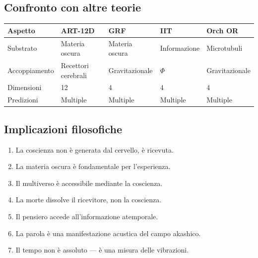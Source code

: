 \subsection{Confronto con altre teorie}
\begin{table}[H]
\centering
\begin{tabular}{@{}lllll@{}}
\toprule
\textbf{Aspetto} & \textbf{ART-12D} & \textbf{GRF} & \textbf{IIT} & \textbf{Orch OR} \\ \midrule
Substrato & Materia oscura & Materia oscura & Informazione & Microtubuli \\
Accoppiamento & Recettori cerebrali & Gravitazionale & $\Phi$ & Gravitazionale \\
Dimensioni & 12 & 4 & 4 & 4 \\
Predizioni & Multiple & Multiple & Multiple & Multiple \\ \bottomrule
\end{tabular}
\end{table}

\subsection{Implicazioni filosofiche}
\begin{enumerate}
    \item La coscienza non è generata dal cervello, è ricevuta.
    \item La materia oscura è fondamentale per l'esperienza.
    \item Il multiverso è accessibile mediante la coscienza.
    \item La morte dissolve il ricevitore, non la coscienza.
    \item Il pensiero accede all'informazione atemporale.
    \item La parola è una manifestazione acustica del campo akashico.
    \item Il tempo non è assoluto --- è una misura delle vibrazioni.
\end{enumerate}


